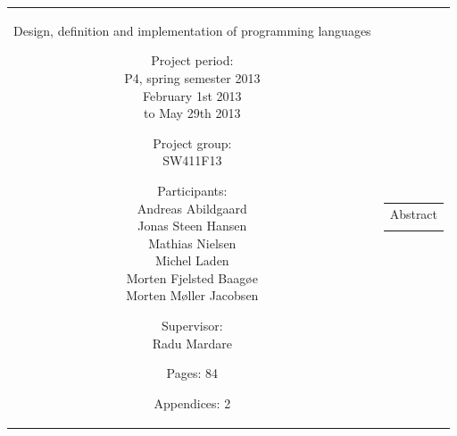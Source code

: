 \begin{nopagebreak}
{\begin{tabular}{cc}
{\begin{description}
Design, definition and implementation of programming languages

\end{description}

\parbox{8cm}{

\begin{description}
\item { Project period:}\\
   P4, spring semester 2013\\
   February 1st 2013 \\
   to May 29th 2013
  \hspace{4cm}
\item { Project group:}\\
  SW411F13
  \hspace{4cm}
\item { Participants:}\\
Andreas Abildgaard \\
Jonas Steen Hansen \\
Mathias Nielsen \\
Michel Laden \\
Morten Fjelsted Baagøe \\
Morten Møller Jacobsen \\
\hspace{2cm}
\item { Supervisor:}\\
Radu Mardare
  
\end{description}
}
\begin{description}
\item { Pages: 84 } 
\item { Appendices: 2}  
\end{description}
\vfill } &
\parbox{7cm}{
  \vspace{.15cm}
  \hfill 
  \begin{tabular}{l}
  { Abstract}\bigskip \\
  \fbox{
    \parbox{6.5cm}{\bigskip
     {\vfill{\small 
     \bigskip}}
     }}
   \end{tabular}}
\end{tabular}} \vspace{1.3cm}
\\ \\ 
\end{nopagebreak}
%
